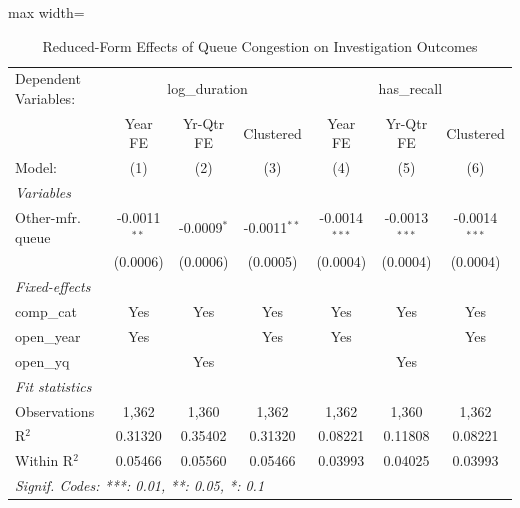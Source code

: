 \begin{table}[htbp]
   \caption{\label{tab:reduced_form} Reduced-Form Effects of Queue Congestion on Investigation Outcomes}
   \centering
   \begin{adjustbox}{max width=\textwidth}
   \begin{tabular}{lcccccc}
      \tabularnewline \midrule \midrule
      Dependent Variables: & \multicolumn{3}{c}{log\_duration} & \multicolumn{3}{c}{has\_recall}\\
                       & Year FE        & Yr-Qtr FE     & Clustered      & Year FE         & Yr-Qtr FE       & Clustered \\   
      Model:           & (1)            & (2)           & (3)            & (4)             & (5)             & (6)\\  
      \midrule
      \emph{Variables}\\
      Other-mfr. queue & -0.0011$^{**}$ & -0.0009$^{*}$ & -0.0011$^{**}$ & -0.0014$^{***}$ & -0.0013$^{***}$ & -0.0014$^{***}$\\   
                       & (0.0006)       & (0.0006)      & (0.0005)       & (0.0004)        & (0.0004)        & (0.0004)\\   
      \midrule
      \emph{Fixed-effects}\\
      comp\_cat        & Yes            & Yes           & Yes            & Yes             & Yes             & Yes\\  
      open\_year       & Yes            &               & Yes            & Yes             &                 & Yes\\  
      open\_yq         &                & Yes           &                &                 & Yes             & \\  
      \midrule
      \emph{Fit statistics}\\
      Observations     & 1,362          & 1,360         & 1,362          & 1,362           & 1,360           & 1,362\\  
      R$^2$            & 0.31320        & 0.35402       & 0.31320        & 0.08221         & 0.11808         & 0.08221\\  
      Within R$^2$     & 0.05466        & 0.05560       & 0.05466        & 0.03993         & 0.04025         & 0.03993\\  
      \midrule \midrule
      \multicolumn{7}{l}{\emph{Signif. Codes: ***: 0.01, **: 0.05, *: 0.1}}\\
   \end{tabular}
   \end{adjustbox}
\end{table}
